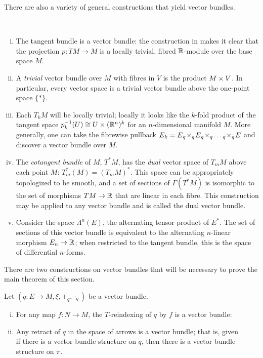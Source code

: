 There are also a variety of general constructions that yield vector bundles.
\begin{example}
  ~\begin{enumerate}[(i)]
    \item The tangent bundle is a vector bundle: the construction in  makes it clear that the projection $p:TM \to M$ is a locally trivial, fibred $\mathbb{R}$-module over the base space $M$.
    \item A \emph{trivial} vector bundle over $M$ with fibres in $V$ is the product $M \times V$. In particular, every vector space is a trivial vector bundle above the one-point space $\{*\}$.
    \item Each $T_kM$ will be locally trivial; locally it looks like the $k$-fold product of the tangent space $p_k^{-1}(U) \cong U \times (\mathbb{R}^n)^k$ for an $n$-dimensional manifold $M$. More generally, one can take the fibrewise pullback $E_k = E {_{q}}\!\times_{q}\! E {_{q}}\!\times_{q}\! \dots {_{q}}\!\times_{q}\! E$ and discover a vector bundle over $M$.
    \item The \emph{cotangent bundle} of $M$, $T^*M$,  has the \emph{dual} vector space of $T_mM$ above each point $M$: $T^*_m(M) = (T_mM)^*$. This space can be appropriately topologized to be smooth, and a set of sections of $\Gamma(T^*M)$ is isomorphic to the set of morphisms $TM \to \mathbb{R}$ that are linear in each fibre. This construction may be applied to any vector bundle and is called the dual vector bundle.
    \item Consider the space $\Lambda^n(E)$, the alternating tensor product of $E^*$. The set of sections of this vector bundle is equivalent to the alternating $n$-linear morphism $E_n \to \mathbb{R}$; when restricted to the tangent bundle, this is the space of differential $n$-forms.
  \end{enumerate}
\end{example}
There are two constructions on vector bundles that will be necessary to prove the main theorem of this section.
\begin{proposition}%
  \label{prop:retracts-reindexing-of-vbuns}
  Let $(q:E \to M, \xi, +_q, \cdot_q)$ be a vector bundle. 
  ~\begin{enumerate}[(i)]
    \item For any map $f:N \to M$, the $T$-reindexing of $q$ by $f$ is a vector bundle:
    \begin{equation}%
      \label{eq:reindex-vbun}
      
    \end{equation}
    \item Any retract of $q$ in the space of arrows is a vector bundle; that is, given
    \begin{equation}%
      \label{eq:ret-of-idemp}
      
    \end{equation}
    if there is a vector bundle structure on $q$, then there is a vector bundle structure on $\pi$.
  \end{enumerate}
\end{proposition}

